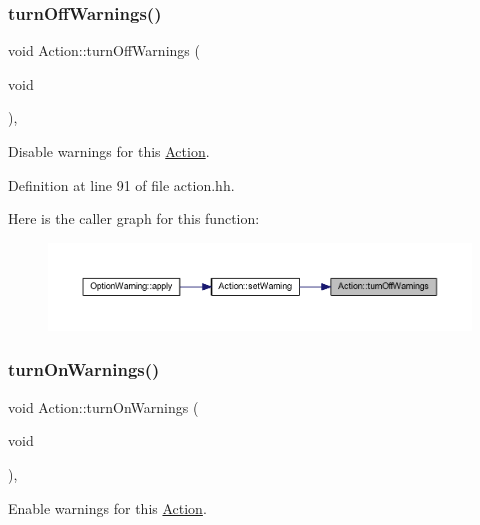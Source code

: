 \subsubsection{\texorpdfstring{turnOffWarnings()}{turnOffWarnings()}}
{\footnotesize\ttfamily void Action\+::turn\+Off\+Warnings (\begin{DoxyParamCaption}\item[{void}]{ }\end{DoxyParamCaption})\hspace{0.3cm}{\ttfamily [inline]}, {\ttfamily [protected]}}



Disable warnings for this \mbox{\hyperlink{class_action}{Action}}. 



Definition at line 91 of file action.\+hh.

Here is the caller graph for this function\+:
\nopagebreak
\begin{figure}[H]
\begin{center}
\leavevmode
\includegraphics[width=350pt]{class_action_a7ee7521e4259621cc001ea272ace4778_icgraph}
\end{center}
\end{figure}
\mbox{\label{class_action_a5784987d90d4ab2cac5c91c32e24c602}} 
\subsubsection{\texorpdfstring{turnOnWarnings()}{turnOnWarnings()}}
{\footnotesize\ttfamily void Action\+::turn\+On\+Warnings (\begin{DoxyParamCaption}\item[{void}]{ }\end{DoxyParamCaption})\hspace{0.3cm}{\ttfamily [inline]}, {\ttfamily [protected]}}



Enable warnings for this \mbox{\hyperlink{class_action}{Action}}. 




